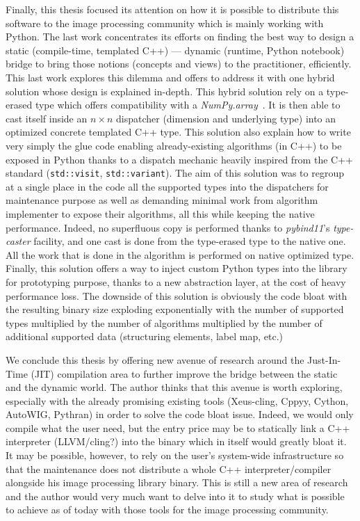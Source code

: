Finally, this thesis focused its attention on how it is possible to distribute this software to the image processing
community which is mainly working with Python. The last work concentrates its efforts on finding the best way to design
a static (compile-time, templated C++) --- dynamic (runtime, Python notebook) bridge to bring those notions (concepts
and views) to the practitioner, efficiently. This last work explores this dilemma and offers to address it with one
hybrid solution whose design is explained in-depth. This hybrid solution rely on a type-erased type which offers
compatibility with a \emph{NumPy.array}~\parencite{harris.2020.numpy}. It is then able to cast itself inside an \(n
\times n\) dispatcher (dimension and underlying type) into an optimized concrete templated C++ type. This solution also
explain how to write very simply the glue code enabling already-existing algorithms (in C++) to be exposed in Python
thanks to a dispatch mechanic heavily inspired from the C++ standard (\texttt{std::visit}, \texttt{std::variant}). The
aim of this solution was to regroup at a single place in the code all the supported types into the dispatchers for
maintenance purpose as well as demanding minimal work from algorithm implementer to expose their algorithms, all this
while keeping the native performance. Indeed, no superfluous copy is performed thanks to \emph{pybind11}'s
\emph{type-caster} facility, and one cast is done from the type-erased type to the native one. All the work that is done
in the algorithm is performed on native optimized type. Finally, this solution offers a way to inject custom Python
types into the library for prototyping purpose, thanks to a new abstraction layer, at the cost of heavy performance
loss. The downside of this solution is obviously the code bloat with the resulting binary size exploding exponentially
with the number of supported types multiplied by the number of algorithms multiplied by the number of additional
supported data (structuring elements, label map, etc.)

We conclude this thesis by offering new avenue of research around the Just-In-Time (JIT) compilation area to further
improve the bridge between the static and the dynamic world. The author thinks that this avenue is worth exploring,
especially with the already promising existing tools (Xeus-cling, Cppyy, Cython, AutoWIG, Pythran) in order to solve the
code bloat issue. Indeed, we would only compile what the user need, but the entry price may be to statically link a C++
interpreter (LLVM/cling?) into the binary which in itself would greatly bloat it. It may be possible, however, to rely
on the user's system-wide infrastructure so that the maintenance does not distribute a whole C++ interpreter/compiler
alongside his image processing library binary. This is still a new area of research and the author would very much want
to delve into it to study what is possible to achieve as of today with those tools for the image processing community.
